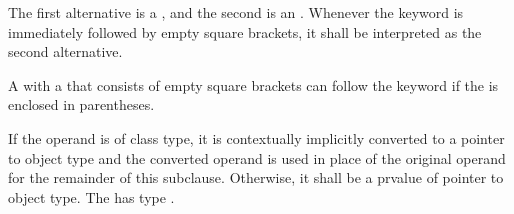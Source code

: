 The first alternative is a
, and the
second is an .
Whenever the  keyword is immediately followed by empty square
brackets, it shall be interpreted as the second alternative.
\begin{footnote}
A
 with a 
that consists of empty square brackets can follow the  keyword
if the  is enclosed in parentheses.
\end{footnote}
If the operand is of
class type, it is contextually implicitly converted
to a pointer to object
type
and the converted operand is used in place of the original operand
for the remainder of this subclause.
Otherwise, it shall be a prvalue of pointer to object type.
The  has type
.


